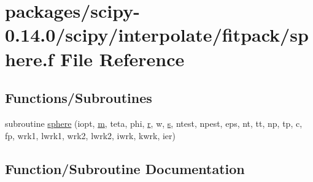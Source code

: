 \hypertarget{sphere_8f}{}\section{packages/scipy-\/0.14.0/scipy/interpolate/fitpack/sphere.f File Reference}
\label{sphere_8f}
\subsection*{Functions/\+Subroutines}
\begin{DoxyCompactItemize}
\item 
subroutine \hyperlink{sphere_8f_a54be8006b7ae25ef3155c47a41a4c88a}{sphere} (iopt, \hyperlink{indexexpr_8h_ab72fdb4031d47b75ab26dd18a437bcdc}{m}, teta, phi, \hyperlink{indexexpr_8h_ac434fd11cc2493608d8d91424d60c17e}{r}, w, \hyperlink{indexexpr_8h_ae024b0db549122b44c349ae28ec990dc}{s}, ntest, npest, eps, nt, tt, np, tp, c, fp, wrk1, lwrk1, wrk2, lwrk2, iwrk, kwrk, ier)
\end{DoxyCompactItemize}


\subsection{Function/\+Subroutine Documentation}
\hypertarget{sphere_8f_a54be8006b7ae25ef3155c47a41a4c88a}{}
